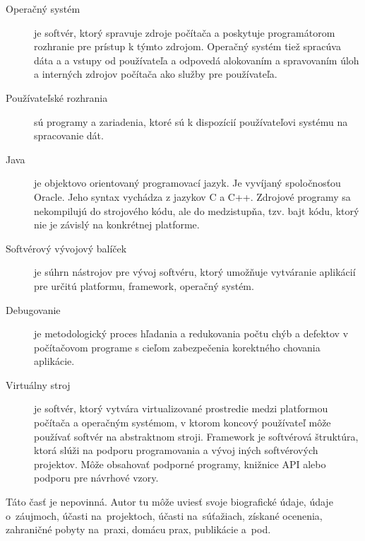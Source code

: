 \documentclass[]{tukediphc}
\begin{document}
\thispagestyle{empty}
\tableofcontents
\newpage

\thispagestyle{empty}
\listoffigures
\newpage

\thispagestyle{empty}
\listoftables
\newpage

\thispagestyle{empty}
\printglossary %
\newpage

\slovnikterminov

\begin{description}

	\item[Operačný systém] je softvér, ktorý spravuje zdroje počítača
a poskytuje programátorom rozhranie pre prístup k týmto zdrojom. Operačný
systém tiež spracúva dáta a a vstupy od používateľa a odpovedá alokovaním
a spravovaním úloh a interných zdrojov počítača ako služby pre používateľa.

	\item[Používateľské rozhrania] sú programy a zariadenia, ktoré sú k dispozícií používateľovi systému na spracovanie dát.

	\item[Java] je objektovo orientovaný programovací jazyk. Je vyvíjaný spoločnosťou Oracle. Jeho syntax vychádza z jazykov C a C++. Zdrojové programy sa nekompilujú do strojového kódu, ale do medzistupňa, tzv. bajt kódu, ktorý nie je závislý na konkrétnej platforme.

\item[Softvérový vývojový balíček] je súhrn nástrojov pre vývoj softvéru, ktorý umožňuje vytváranie aplikácií pre určitú platformu, framework, operačný systém.

	\item[Debugovanie] je metodologický proces hľadania a redukovania počtu chýb a defektov v počítačovom programe s cieľom zabezpečenia korektného chovania aplikácie.

	\item[Virtuálny stroj] je softvér, ktorý vytvára virtualizované prostredie medzi platformou počítača a operačným systémom, v ktorom koncový používateľ môže používať softvér na abstraktnom stroji.
Framework je softvérová štruktúra, ktorá slúži na podporu programovania a vývoj iných softvérových projektov. Môže obsahovať podporné programy, knižnice API alebo podporu pre návrhové vzory.

\end{description}

\kslovnikterminov
%

%

%

%

%

%

%

%

%

%

%
\curriculumvitae\protect\label{page:posledna}
Táto časť\/ je nepovinná. Autor tu môže uviesť\/ svoje biografické
údaje, údaje o~záujmoch, účasti na~projektoch, účasti na~súťažiach,
získané ocenenia, zahraničné pobyty na~praxi, domácu prax, publikácie
a~pod.
\kcurriculumvitae
\end{document}

